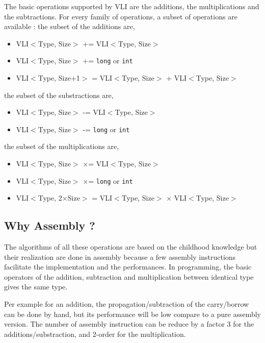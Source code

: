 \documentclass[11pt]{amsart}
\begin{document}
The basic operations supported by VLI are the additions, the multiplications and the subtractions. For every family of operations, a subset of operations are available :
the subset of the additions are,
\begin{itemize}
\item VLI$<$Type, Size$>$ += VLI$<$Type, Size$>$
\item VLI$<$Type, Size$>$ += \texttt{long} or \texttt{int}
\item VLI$<$Type, Size+1$>$ = VLI$<$Type, Size$>$ + VLI$<$Type, Size$>$
\end{itemize}
the subset of the substractions are,
\begin{itemize}
\item VLI$<$Type, Size$>$ -= VLI$<$Type, Size$>$
\item VLI$<$Type, Size$>$ -= \texttt{long} or \texttt{int}
\end{itemize}
the subset of the  multiplications are,
\begin{itemize}
\item VLI$<$Type, Size$>$  $\times$= VLI$<$Type, Size$>$
\item VLI$<$Type, Size$>$  $\times$= \texttt{long} or \texttt{int}
\item VLI$<$Type, 2$\times$Size$>$ = VLI$<$Type, Size$>$ $\times$ VLI$<$Type, Size$>$
\end{itemize}

\subsection*{Why Assembly ?}

The algorithms of all these operations are based on the childhood knowledge but their realization are done in assembly because a few assembly instructions facilitate the implementation and the performances.
In programming, the basic operators of the addition, subtraction and multiplication between identical type gives the same type. 

Per example for an addition, the propagation/subtraction of the  carry/borrow can be done by hand, but its performance will be low compare to a pure assembly version. 
The number of assembly instruction can be reduce by a factor 3 for the additions/substraction, and  2-order for the multiplication.
\end{document}
